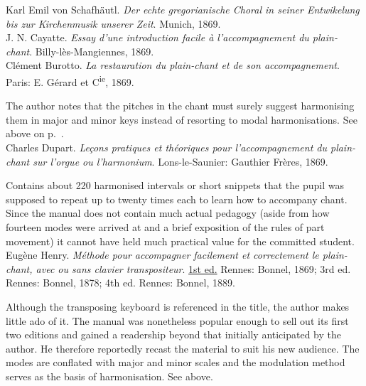     \parindent=0pt
    \hangindent=0pt
  \covid{}Karl Emil von Schafhäutl. \emph{Der echte gregorianische Choral in seiner Entwikelung bis zur Kirchenmusik unserer Zeit}. Munich, 1869. \\

    \parindent=0pt
    \hangindent=0pt
  \covid{}J. N. Cayatte. \emph{Essay d'une introduction facile à l'accompagnement du plain-chant}. Billy-lès-Mangiennes, 1869. \\

    \parindent=0pt
    \hangindent=0pt
  Clément Burotto. \emph{La restauration du plain-chant et de son accompagnement}. Paris:  E. Gérard et C\textsuperscript{ie}, 1869.

     \parindent=20pt
     \hangindent=20pt
     The author notes that the pitches in the chant must surely suggest harmonising them in major and minor keys instead of resorting to modal harmonisations. See above on p.~\pageref{hl:burotto}.\\

    \parindent=0pt
    \hangindent=0pt
  Charles Dupart. \emph{Leçons pratiques et théoriques pour l'accompagnement du plain-chant sur l'orgue ou l'harmonium}. Lons-le-Saunier:  Gauthier Frères, 1869.

     \parindent=20pt
     \hangindent=20pt
     Contains about 220 harmonised intervals or short snippets that the pupil was supposed to repeat up to twenty times each to learn how to accompany chant. Since the manual does not contain much actual pedagogy (aside from how fourteen modes were arrived at and a brief exposition of the rules of part movement) it cannot have held much practical value for the committed student.\\

    \parindent=0pt
    \hangindent=0pt
  Eugène Henry. \emph{Méthode pour accompagner facilement et correctement le plain-chant, avec ou sans clavier transpositeur}. \underline{1st ed.} Rennes:  Bonnel, 1869;  3rd ed. Rennes:  Bonnel, 1878;  4th ed. Rennes:  Bonnel, 1889.

     \parindent=20pt
     \hangindent=20pt
     Although the transposing keyboard is referenced in the title, the author makes little ado of it. The manual was nonetheless popular enough to sell out its first two editions and gained a readership beyond that initially anticipated by the author. He therefore reportedly recast the material to suit his new audience. The modes are conflated with major and minor scales and the modulation method serves as the basis of harmonisation. See  above.\\

